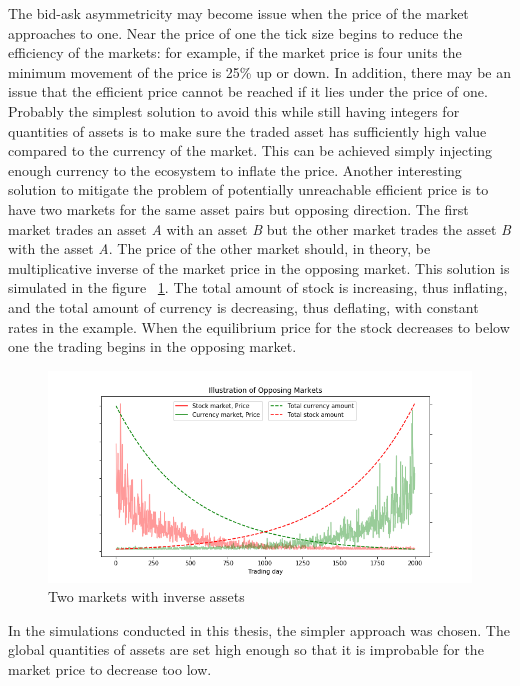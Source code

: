 The bid-ask asymmetricity may become issue when the price of the market
approaches to one. Near the price of one the tick size begins to reduce the efficiency
of the markets: for example, if the market price is four units the minimum movement 
of the price is 25\% up or down. In addition, there may be an issue that the efficient
price cannot be reached if it lies under the price of one. Probably
the simplest solution to avoid this while still having integers for quantities 
of assets is to make sure the traded asset has sufficiently high value
compared to the currency of the market. This can be achieved simply injecting
enough currency to the ecosystem to inflate the price. Another interesting 
solution to mitigate the problem of potentially unreachable efficient price 
is to have two markets for the same asset pairs but opposing direction. 
The first market trades an asset \textit{A} with an asset \textit{B} but the 
other market trades the asset \textit{B} with the asset \textit{A}. 
The price of the other market should, in theory, be multiplicative inverse of 
the market price in the opposing market. This solution is simulated in the figure 
~\ref{fig:opposing_markets}. The total amount of stock is increasing, 
thus inflating, and the total amount of currency is decreasing, thus deflating, 
with constant rates in the example. When the equilibrium price for the stock 
decreases to below one the trading begins in the opposing market.

\begin{figure}
    \includegraphics[width=\linewidth]{plots/opposing_markets.png}
    \caption{Two markets with inverse assets}
    \label{fig:opposing_markets}
\end{figure}

In the simulations conducted in this thesis, the simpler approach was chosen. 
The global quantities of assets are set high enough so that it is improbable 
for the market price to decrease too low. 

